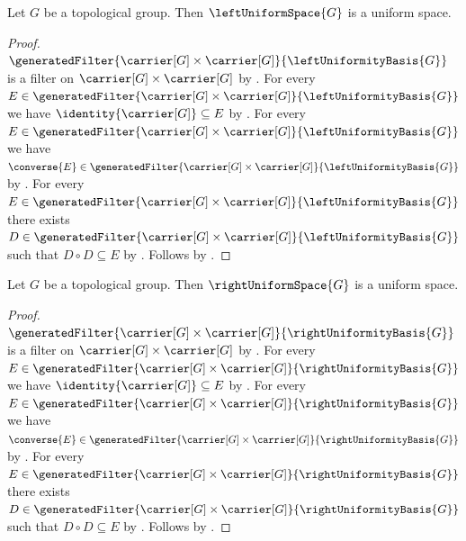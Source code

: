 \begin{theorem}\label{left_uniform_space_is_uniform_space}
    Let $G$ be a topological group.
    Then $\leftUniformSpace{G}$ is a uniform space.
\end{theorem}
\begin{proof}
    $\generatedFilter
        {\carrier[G]\times\carrier[G]}{\leftUniformityBasis{G}}$
        is a filter on $\carrier[G]\times\carrier[G]$
        by .
    For every $E\in\generatedFilter
        {\carrier[G]\times\carrier[G]}{\leftUniformityBasis{G}}$ we have
        $\identity{\carrier[G]}\subseteq E$
        by .
    For every $E\in\generatedFilter
        {\carrier[G]\times\carrier[G]}{\leftUniformityBasis{G}}$ we have
        $\converse{E}\in\generatedFilter
            {\carrier[G]\times\carrier[G]}{\leftUniformityBasis{G}}$
        by .
    For every $E\in\generatedFilter
        {\carrier[G]\times\carrier[G]}{\leftUniformityBasis{G}}$ there
        exists $D\in\generatedFilter
            {\carrier[G]\times\carrier[G]}{\leftUniformityBasis{G}}$
        such that $D\circ D\subseteq E$
        by .
    Follows by .
\end{proof}

\begin{theorem}\label{right_uniform_space_is_uniform_space}
    Let $G$ be a topological group.
    Then $\rightUniformSpace{G}$ is a uniform space.
\end{theorem}
\begin{proof}
    $\generatedFilter
        {\carrier[G]\times\carrier[G]}{\rightUniformityBasis{G}}$
        is a filter on $\carrier[G]\times\carrier[G]$
        by .
    For every $E\in\generatedFilter
        {\carrier[G]\times\carrier[G]}{\rightUniformityBasis{G}}$ we have
        $\identity{\carrier[G]}\subseteq E$
        by .
    For every $E\in\generatedFilter
        {\carrier[G]\times\carrier[G]}{\rightUniformityBasis{G}}$ we have
        $\converse{E}\in\generatedFilter
            {\carrier[G]\times\carrier[G]}{\rightUniformityBasis{G}}$
        by .
    For every $E\in\generatedFilter
        {\carrier[G]\times\carrier[G]}{\rightUniformityBasis{G}}$ there
        exists $D\in\generatedFilter
            {\carrier[G]\times\carrier[G]}{\rightUniformityBasis{G}}$
        such that $D\circ D\subseteq E$
        by .
    Follows by .
\end{proof}

